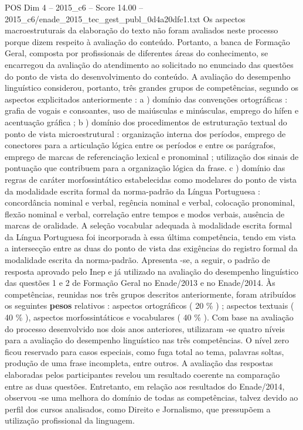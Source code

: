 \begin{textsample}{POS Dim 4 – 2015\_c6 – Score 14.00 – 2015\_c6/enade\_2015\_tec\_gest\_publ\_0d4a20dfe1.txt}
Os aspectos macroestruturais da elaboração do texto não foram avaliados neste processo porque dizem respeito à avaliação do conteúdo.
Portanto, a banca de Formação Geral, composta por profissionais de diferentes áreas do conhecimento, se encarregou da avaliação do atendimento ao solicitado no enunciado das questões do ponto de vista do desenvolvimento do conteúdo.
A avaliação do desempenho linguístico considerou, portanto, três grandes grupos de competências, segundo os aspectos explicitados anteriormente : a ) domínio das convenções ortográficas : grafia de vogais e consoantes, uso de maiúsculas e minúsculas, emprego do hífen e acentuação gráfica ; b ) domínio dos procedimentos de estruturação textual do ponto de vista microestrutural : organização interna dos períodos, emprego de conectores para a articulação lógica entre os períodos e entre os parágrafos, emprego de marcas de referenciação lexical e pronominal ; utilização dos sinais de pontuação que contribuem para a organização lógica da frase. c ) domínio das regras de caráter morfossintático estabelecidas como modelares do ponto de vista da modalidade escrita formal da norma-padrão da Língua Portuguesa : concordância nominal e verbal, regência nominal e verbal, colocação pronominal, flexão nominal e verbal, correlação entre tempos e modos verbais, ausência de marcas de oralidade.
A seleção vocabular adequada à modalidade escrita formal da Língua Portuguesa foi incorporada à essa última competência, tendo em vista a intersecção entre as duas do ponto de vista das exigências do registro formal da modalidade escrita da norma-padrão.
Apresenta -se, a seguir, o padrão de resposta aprovado pelo Inep e já utilizado na avaliação do desempenho linguístico das questões 1 e 2 de Formação Geral no Enade/2013 e no Enade/2014.
Às competências, reunidas nos três grupos descritos anteriormente, foram atribuídos os seguintes \textbf{pesos} relativos : aspectos ortográficos ( 20 \% ) ; aspectos textuais ( 40 \% ), aspectos morfossintáticos e vocabulares ( 40 \% ).
Com base na avaliação do processo desenvolvido nos dois anos anteriores, utilizaram -se quatro níveis para a avaliação do desempenho linguístico nas três competências.
O nível zero ficou reservado para casos especiais, como fuga total ao tema, palavras soltas, produção de uma frase incompleta, entre outros.
A avaliação das respostas elaboradas pelos participantes revelou um resultado coerente na comparação entre as duas questões.
Entretanto, em relação aos resultados do Enade/2014, observou -se uma melhora do domínio de todas as competências, talvez devido ao perfil dos cursos analisados, como Direito e Jornalismo, que pressupõem a utilização profissional da linguagem.

\end{textsample}
